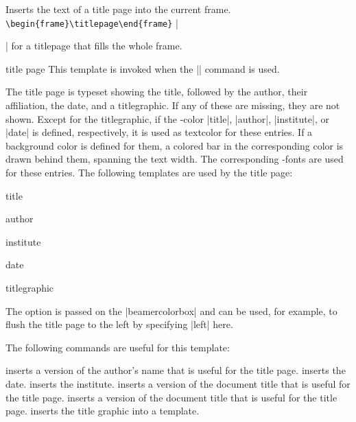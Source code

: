 \begin{command}{\titlepage}
  Inserts the text of a title page into the current frame.
  \example
  \verb+\begin{frame}\titlepage\end{frame}+
  \example
  |\begin{frame}[plain]\titlepage\end{frame}| for a titlepage that fills the whole frame.

  \begin{element}{title page}\yes\yes\yes
    This template is invoked when the |\titlepage| command is used.

    \begin{templateoptions}
      The title page is typeset showing the title, followed by the author, their affiliation, the date, and a titlegraphic. If any of these are missing, they are not shown. Except for the titlegraphic, if the \beamer-color |title|, |author|, |institute|, or |date| is defined, respectively, it is used as textcolor for these entries. If a background color is defined for them, a colored bar in the corresponding color is drawn behind them, spanning the text width. The corresponding \beamer-fonts are used for these entries. The following templates are used by the title page:
      \begin{element}{title}\yes\yes\yes
      \end{element}
      \begin{element}{author}\yes\yes\yes
      \end{element}
      \begin{element}{institute}\yes\yes\yes
      \end{element}
      \begin{element}{date}\yes\yes\yes
      \end{element}
      \begin{element}{titlegraphic}\yes\no\no
      \end{element}      
      
      The  option is passed on the |beamercolorbox| and can be used, for example, to flush the title page to the left by specifying |left| here.
    \end{templateoptions}

    The following commands are useful for this template:
    \begin{templateinserts}
      \iteminsert{\insertauthor} inserts a version of the author's name that is useful for the title page.
      \iteminsert{\insertdate} inserts the date.
      \iteminsert{\insertinstitute} inserts the institute.
      \iteminsert{\inserttitle} inserts a version of the document title that is useful for the title page.
      \iteminsert{\insertsubtitle} inserts a version of the document title that is useful for the title page.
      \iteminsert{\inserttitlegraphic} inserts the title graphic into a template.
    \end{templateinserts}
  \end{element}
\end{command}

